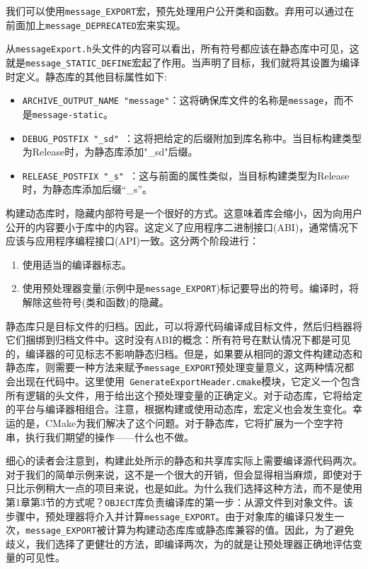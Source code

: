 我们可以使用\texttt{message\_EXPORT}宏，预先处理用户公开类和函数。弃用可以通过在前面加上\texttt{message\_DEPRECATED}宏来实现。

从\texttt{messageExport.h}头文件的内容可以看出，所有符号都应该在静态库中可见，这就是\texttt{message\_STATIC\_DEFINE}宏起了作用。当声明了目标，我们就将其设置为编译时定义。静态库的其他目标属性如下:

\begin{itemize}
\item \texttt{ARCHIVE\_OUTPUT\_NAME "message"}：这将确保库文件的名称是\texttt{message}，而不是\texttt{message-static}。

\item \texttt{DEBUG\_POSTFIX "\_sd" }：这将把给定的后缀附加到库名称中。当目标构建类型为Release时，为静态库添加"\_sd"后缀。

\item \texttt{RELEASE\_POSTFIX "\_s" }：这与前面的属性类似，当目标构建类型为Release时，为静态库添加后缀“\_s”。

\end{itemize}


构建动态库时，隐藏内部符号是一个很好的方式。这意味着库会缩小，因为向用户公开的内容要小于库中的内容。这定义了应用程序二进制接口(ABI)，通常情况下应该与应用程序编程接口(API)一致。这分两个阶段进行：

\begin{enumerate}
\item 使用适当的编译器标志。

\item 使用预处理器变量(示例中是\texttt{message\_EXPORT})标记要导出的符号。编译时，将解除这些符号(类和函数)的隐藏。

\end{enumerate}

静态库只是目标文件的归档。因此，可以将源代码编译成目标文件，然后归档器将它们捆绑到归档文件中。这时没有ABI的概念：所有符号在默认情况下都是可见的，编译器的可见标志不影响静态归档。但是，如果要从相同的源文件构建动态和静态库，则需要一种方法来赋予\texttt{message\_EXPORT}预处理变量意义，这两种情况都会出现在代码中。这里使用\texttt{ GenerateExportHeader.cmake}模块，它定义一个包含所有逻辑的头文件，用于给出这个预处理变量的正确定义。对于动态库，它将给定的平台与编译器相组合。注意，根据构建或使用动态库，宏定义也会发生变化。幸运的是，CMake为我们解决了这个问题。对于静态库，它将扩展为一个空字符串，执行我们期望的操作——什么也不做。

细心的读者会注意到，构建此处所示的静态和共享库实际上需要编译源代码两次。对于我们的简单示例来说，这不是一个很大的开销，但会显得相当麻烦，即使对于只比示例稍大一点的项目来说，也是如此。为什么我们选择这种方法，而不是使用第1章第3节的方式呢？\texttt{OBJECT}库负责编译库的第一步：从源文件到对象文件。该步骤中，预处理器将介入并计算\texttt{message\_EXPORT}。由于对象库的编译只发生一次，\texttt{message\_EXPORT}被计算为构建动态库库或静态库兼容的值。因此，为了避免歧义，我们选择了更健壮的方法，即编译两次，为的就是让预处理器正确地评估变量的可见性。

